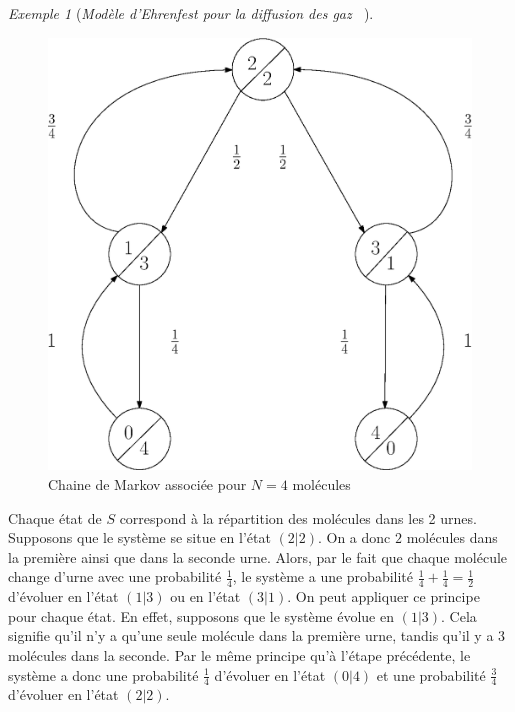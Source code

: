 \documentclass[12pt,a4paper]{report}
\theoremstyle{definition}%
\theoremstyle{remark}
\newtheorem{example}{Exemple}[chapter]
\begin{document}
\begin{example}[\textit{Modèle d'Ehrenfest pour la diffusion des gaz ~\cite{Course3}}]
	\begin{figure}[H]
		\centering
		\includegraphics[scale=0.4]{figures/Ehrenfest.eps}
		\caption{Chaine de Markov associée pour $N=4$ molécules}
		\label{ehrenfestCM}
	\end{figure}
	Chaque état de $S$ correspond à la répartition des molécules dans les 2 urnes. Supposons que le système se situe en l'état $(2 | 2)$. On a donc $2$ molécules dans la première ainsi que dans la seconde urne. Alors, par le fait que chaque molécule change d'urne avec une probabilité $\frac{1}{4}$, le système a une probabilité $\frac{1}{4} + \frac{1}{4} = \frac{1}{2}$ d'évoluer en l'état $(1 | 3)$ ou en l'état $(3 | 1 )$. On peut appliquer ce principe pour chaque état. En effet, supposons que le système évolue en $(1 | 3)$. Cela signifie qu'il n'y a qu'une seule molécule dans la première urne, tandis qu'il y a 3 molécules dans la seconde. Par le même principe qu'à l'étape précédente, le système a donc une probabilité $\frac{1}{4}$ d'évoluer en l'état $(0 | 4)$ et une probabilité $\frac{3}{4}$ d'évoluer en l'état $(2 | 2)$.
	\\
	

\end{example}
\end{document}
